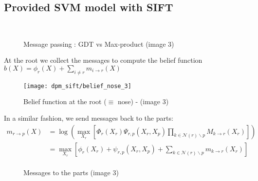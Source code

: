 \documentclass{acmsiggraph}
\newcommand{\1}{\mathbbm{1}}
\begin{document}
	\subsection{Provided SVM model with SIFT}
		\begin{figure}[H]
		\centering
		\hspace{10pt}\\
		\hspace{10pt}
		\caption{Message passing : GDT vs Max-product (image 3)}
		\end{figure}
		At the root we collect the messages to compute the belief function $b(X) = \phi_r(X)+\sum_{i\neq r}m_{i\to r}(X)$
		\begin{figure}[H]
		\centering
		\texttt{[image: dpm\_sift/belief\_nose\_3]}
		\caption{Belief function at the root ($\equiv$ nose) - (image 3)}
		\end{figure}
		In a similar fashion, we send messages back to the parts:
		\[\begin{split}
		m_{r\to p}(X)  & = \log\left(\max_{X_r} \left[\Phi_r(X_r) \Psi_{r,p}(X_r,X_p)\prod_{k\in\mathcal N(r)\backslash p}M_{k\to r}(X_r)\right]\right)\\
		& = \max_{X_r}\left[\phi_r(X_r)+\psi_{r,p}(X_r,X_p)+\sum_{k\in\mathcal N(r)\backslash p}m_{k\to r}(X_r)\right]\\
		\end{split}\]
		\begin{figure}[H]
		\centering
		\hspace{5pt}
		\hspace{5pt}
		\hspace{5pt}

		\caption{Messages to the parts (image 3)}
		\end{figure}
	\newpage
\end{document}
